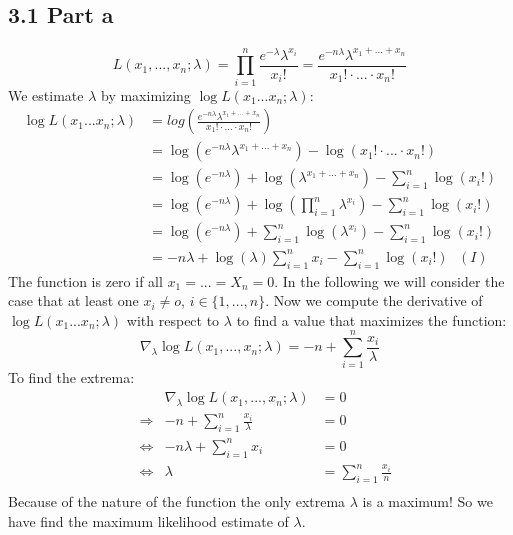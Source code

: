 \documentclass[a4paper]{article}
\begin{document}
    \subsection*{3.1 Part a}
        $$L(x_1,...,x_n;\lambda) = \prod\limits_{i=1}^n \frac{e^{-\lambda} \lambda^{x_i}}{x_i !}
        = \frac{e^{- n \lambda} \lambda^{x_1 + ... + x_n}}{x_1! \cdot ... \cdot x_n!}$$
        We estimate $\lambda$ by maximizing $\log L(x_1 ... x_n; \lambda)$:
        \begin{align*}
            \log L(x_1 ... x_n; \lambda) &= log \left( \frac{e^{- n \lambda} \lambda^{x_1 + ... + x_n}}{x_1! \cdot ... \cdot x_n!} \right)\\
            &= \log \left(e^{- n \lambda} \lambda^{x_1 + ... + x_n}\right) - \log \left(x_1! \cdot ... \cdot x_n!\right)\\
            &= \log \left(e^{- n \lambda}\right) + \log \left(\lambda^{x_1 + ... + x_n}\right) - \sum\limits_{i=1}^n \log \left(x_i !\right)\\
            &= \log \left(e^{- n \lambda}\right) + \log \left(\prod\limits_{i=1}^n \lambda^{x_i}\right) - \sum\limits_{i=1}^n \log \left(x_i !\right)\\
            &= \log \left(e^{- n \lambda}\right) + \sum\limits_{i=1}^n \log \left(\lambda^{x_i}\right) - \sum\limits_{i=1}^n \log \left(x_i !\right)\\
            &= -n \lambda + \log(\lambda) \sum\limits_{i=1}^n x_i - \sum\limits_{i=1}^n \log \left(x_i !\right)\ \ \ (I)
        \end{align*}
        The function is zero if all $x_1=...=X_n=0$.
        In the following we will consider the case that at least one $x_i \neq o$, $i \in \{1,...,n\}$.
        Now we compute the derivative of $\log L(x_1 ... x_n; \lambda)$ with respect to $\lambda$ to find a value that maximizes the function:
        $$\nabla_{\lambda} \log L(x_1,...,x_n;\lambda) = -n + \sum\limits_{i=1}^n \frac{x_i}{\lambda}$$
        To find the extrema:
        \begin{align*}
            & & \nabla_{\lambda} \log L(x_1,...,x_n;\lambda) &= 0\\
            &\Rightarrow &  -n + \sum\limits_{i=1}^n \frac{x_i}{\lambda} &= 0\\
            &\Leftrightarrow &  -n \lambda + \sum\limits_{i=1}^n x_i &= 0\\
            &\Leftrightarrow &  \lambda &= \sum\limits_{i=1}^n \frac{x_i}{n}\\
        \end{align*}
        Because of the nature of the function the only extrema $\lambda$ is a maximum!
        So we have find the maximum likelihood estimate of $\lambda$.
        
\end{document}
